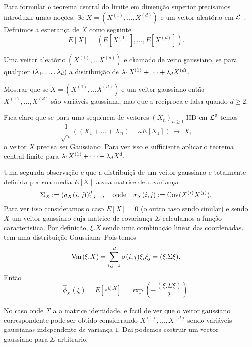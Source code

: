 Para formular o teorema central do limite em dimenção superior precisamos introduzir umas noções.
Se $X=(X^{(1)},\dots,X^{(d)})$ e um veitor aleatório em ${\mathcal L}^1$. Definimos a esperança de $X$ como seguinte
$$E[X]= (E[X^{(1)}],\dots,E[X^{(d)}]).$$


\begin{definition}
 Uma veitor aleatório $(X^{(1)},\dots X^{(d)})$ e chamado de veito gaussiano, se para qualquer $(\lambda_1,\dots,\lambda_d)$
 a distribuição de
 $\lambda_1 X^{(1)} +\dots+\lambda_d X^{(d)}$.
\end{definition}

\begin{exercise}
 Mostrar que se $X=(X^{(1)},\dots X^{(d)})$ e um veitor gaussiano então $X^{(1)},\dots,X^{(d)}$ são variáveis gaussiana, mas que a reciproca e falsa quando $d\ge 2$.
\end{exercise}


Fica claro que se para uma sequência de veitores $(X_n)_{n\ge 1}$ IID em ${\mathcal L}^2$ temos
$$ \frac{1}{\sqrt{n}}( (X_1+\dots+X_n) -nE[X_1])\ \Longrightarrow \ X, $$
o veitor $X$ precisa ser Gaussiano. Para ver isso e sufficiente aplicar o teorema central limite para
$\lambda_1 X^{(1)} +\dots+\lambda_d X^d.$

\medskip

Uma segunda observação e que a distribuiçã de um veitor gaussiano e totalmente definida por sua media
$E[X]$
a sua matrice de covariança
\begin{equation}
 \Sigma_X:=(\sigma_X(i,j))_{i,j=1}^d, \quad  \text{onde} \quad \sigma_X(i,j):= \operatorname{Cov}(X^{(i)}X^{(j)}).
\end{equation}
Para ver isso consideramos o caso $E[X]=0$ (o outro caso sendo similar)
e sendo $X$ um veitor gaussiano cuja matrice de covariança $\Sigma$ calculamos a função caracteristica.
Por definição, $\xi.X$ sendo uma combinação linear das coordenadas, tem uma distribuição Gaussiana.
Pois temos
\begin{equation}
\operatorname{Var}(\xi.X)=\sum_{i,j=1}^d \sigma(i,j) \xi_i \xi_j= (\xi. \Sigma \xi).
\end{equation}
Então
\begin{equation}
 \hat \phi_X(\xi)= E[e^{i\xi.X}]=\exp\left(-\frac{(\xi. \Sigma \xi)}{2}\right).
\end{equation}

No caso onde $\Sigma$ a a matrice identidade, e facil de ver que o veitor gaussiano correspondente pode ser obtido
considerando $X^{(1)},\dots,X^{(d)}$ sendo variáveis gaussianas independente de variança $1$. Dai podemos costruir um vector gaussiano para $\Sigma$ arbitrario.


